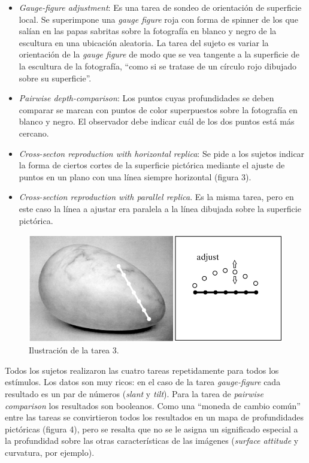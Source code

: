 \documentclass[a4paper,12pt]{article}
\begin{document}
\begin{itemize}
	\item {\itshape Gauge-figure adjustment}: Es una tarea de sondeo de orientación de superficie local. Se superimpone una {\itshape gauge figure} roja con forma de spinner de los que salían en las papas sabritas sobre la fotografía en blanco y negro de la escultura en una ubicación aleatoria. La tarea del sujeto es variar la orientación de la {\itshape gauge figure} de modo que se vea tangente a la superficie de la escultura de la fotografía, ``como si se tratase de un círculo rojo dibujado sobre su superficie''. 
	\item {\itshape Pairwise depth-comparison}: Los puntos cuyas profundidades se deben comparar se marcan con puntos de color superpuestos sobre la fotografía en blanco y negro. El observador debe indicar cuál de los dos puntos está más cercano.
	\item {\itshape Cross-secton reproduction with horizontal replica}: Se pide a los sujetos indicar la forma de ciertos cortes de la superficie pictórica mediante el ajuste de puntos en un plano con una línea siempre horizontal (figura 3). 
	\item {\itshape Cross-section reproduction with parallel replica}. Es la misma tarea, pero en este caso la línea a ajustar era paralela a la línea dibujada sobre la superficie pictórica.
\end{itemize}

\begin{figure}[ht]
	\begin{center}
		\includegraphics[scale=0.3]{Koenderick2001(3).png}
		\caption{Ilustración de la tarea 3.}
	\end{center}
\end{figure}

Todos los sujetos realizaron las cuatro tareas repetidamente para todos los estímulos. Los datos son muy ricos: en el caso de la tarea {\itshape gauge-figure} cada resultado es un par de números ({\itshape slant} y {\itshape tilt}). Para la tarea de {\itshape pairwise comparison} los resultados son booleanos.
Como una ``moneda de cambio común'' entre las tareas se convirtieron todos los resultados en un mapa de profundidades pictóricas (figura 4), pero se resalta que no se le asigna un significado especial a la profundidad sobre las otras características de las imágenes ({\itshape surface attitude} y curvatura, por ejemplo).
\end{document}

